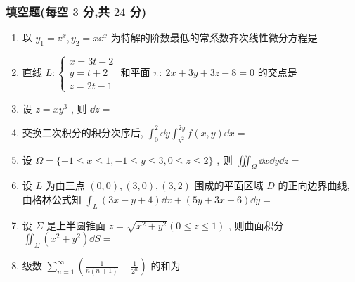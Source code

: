 \subsubsection{填空题(每空 $3$ 分,共 $24$ 分)}
\begin{enumerate}
	\item 以 $y_{1}=\ee^{x}, y_{2}=x \ee^{x}$ 为特解的阶数最低的常系数齐次线性微分方程是\underline{\hspace{8pc}}
	
	\item 直线 $L:\begin{cases}
	x=3t-2\\
	y=t+2\\
	z=2t-1
	\end{cases}$ 和平面 $\pi:\ 2 x+3 y+3 z-8=0$ 的交点是\underline{\hspace{8pc}}
	
	\item 设 $z=xy^3$ , 则 $\dd z=$\underline{\hspace{8pc}}
	
	\item 交换二次积分的积分次序后, $\int_{0}^{2} \dd y \int_{y^{2}}^{2 y} f(x, y) \dd x=$\underline{\hspace{8pc}}
	
	\item 设 $\Omega=\{-1 \leq x \leq 1,-1 \leq y \leq 3,0 \leq z \leq 2\}$ , 则 $\iiint_{\Omega} \dd x \dd y \dd z=$\underline{\hspace{8pc}}
	
	\item 设 $L$ 为由三点 $(0,0),(3,0),(3,2)$ 围成的平面区域 $D$ 的正向边界曲线, 由格林公式知 $\int_{L}(3 x-y+4) \dd x+(5 y+3 x-6) \dd y=$\underline{\hspace{8pc}}
	
	\item 设 $\Sigma$ 是上半圆锥面 $z=\sqrt{x^{2}+y^{2}}(0 \leq z \leq 1)$ , 则曲面积分 $\iint_{\Sigma}\left(x^2+y^2\right)\dd S=$\underline{\hspace{8pc}}
	
	\item 级数 $\sum_{n=1}^{\infty}\left(\frac{1}{n(n+1)}-\frac{1}{2^{n}}\right)$ 的和为\underline{\hspace{8pc}}
\end{enumerate}

